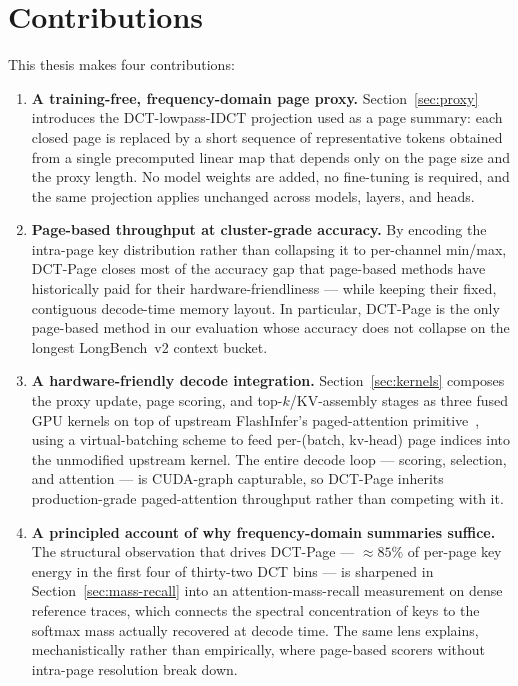 \section{Contributions}\label{sec:contributions}

This thesis makes four contributions:

\begin{enumerate}
  \item \textbf{A training-free, frequency-domain page proxy.}
    Section~\ref{sec:proxy} introduces the DCT-lowpass-IDCT
    projection used as a page summary: each closed page is replaced
    by a short sequence of representative tokens obtained from a
    single precomputed linear map that depends only on the page size
    and the proxy length.  No model weights are added, no
    fine-tuning is required, and the same projection applies
    unchanged across models, layers, and heads.
  \item \textbf{Page-based throughput at cluster-grade accuracy.}
    By encoding the intra-page key distribution rather than
    collapsing it to per-channel min/max, DCT-Page closes most of
    the accuracy gap that page-based methods have historically paid
    for their hardware-friendliness --- while keeping their fixed,
    contiguous decode-time memory layout.  In particular, DCT-Page
    is the only page-based method in our evaluation whose accuracy
    does not collapse on the longest LongBench~v2 context bucket.
  \item \textbf{A hardware-friendly decode integration.}
    Section~\ref{sec:kernels} composes the proxy update, page
    scoring, and top-$k$/KV-assembly stages as three fused GPU
    kernels on top of upstream FlashInfer's paged-attention
    primitive~\cite{ye2025flashinfer}, using a virtual-batching
    scheme to feed per-(batch, kv-head) page indices into the
    unmodified upstream kernel.  The entire decode loop --- scoring,
    selection, and attention --- is CUDA-graph capturable, so
    DCT-Page inherits production-grade paged-attention throughput
    rather than competing with it.
  \item \textbf{A principled account of why frequency-domain
    summaries suffice.}  The structural observation that drives
    DCT-Page --- $\approx 85\%$ of per-page key energy in the first
    four of thirty-two DCT bins --- is sharpened in
    Section~\ref{sec:mass-recall} into an attention-mass-recall
    measurement on dense reference traces, which connects the
    spectral concentration of keys to the softmax mass actually
    recovered at decode time.  The same lens explains, mechanistically
    rather than empirically, where page-based scorers without
    intra-page resolution break down.
\end{enumerate}


